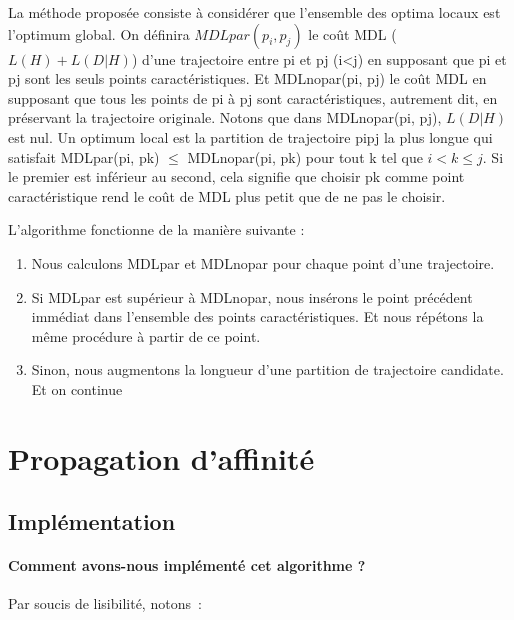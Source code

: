 \begin{appendix}
La méthode proposée consiste à considérer que l'ensemble des optima locaux est l'optimum global. On définira $MDLpar(p_i, p_j)$ le coût MDL ($ L(H) + L(D|H) $) d'une trajectoire entre pi et pj (i<j) en supposant que pi et pj sont les seuls points caractéristiques. Et MDLnopar(pi, pj) le coût MDL en supposant que tous les points de pi à pj sont caractéristiques, autrement dit, en préservant la trajectoire originale. Notons que dans MDLnopar(pi, pj), $L(D|H)$ est nul. Un optimum local est la partition de trajectoire pipj la plus longue qui satisfait MDLpar(pi, pk) $\le$ MDLnopar(pi, pk) pour tout k tel que $i < k \le j$. Si le premier est inférieur au second, cela signifie que choisir pk comme point caractéristique rend le coût de MDL plus petit que de ne pas le choisir.

L'algorithme fonctionne de la manière suivante :

\begin{enumerate}
    \item Nous calculons MDLpar et MDLnopar pour chaque point d'une trajectoire. 
    \item Si MDLpar est supérieur à MDLnopar, nous insérons le point précédent immédiat dans l'ensemble des points caractéristiques. Et nous répétons la même procédure à partir de ce point. 
    \item Sinon, nous augmentons la longueur d'une partition de trajectoire candidate. Et on continue
\end{enumerate}

\chapter{Propagation d'affinité}
\section{Implémentation}
\label{an:propa}
\subsubsection{Comment avons-nous implémenté cet algorithme ?}
Par soucis de lisibilité, notons :



\end{appendix}
